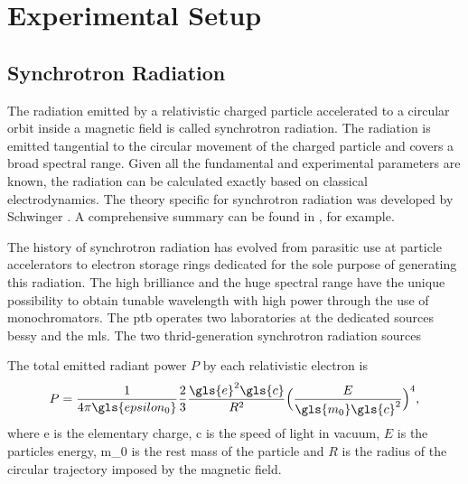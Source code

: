 \chapter{Experimental Setup}
\section{Synchrotron Radiation}
The radiation emitted by a relativistic charged particle accelerated to a circular orbit inside a magnetic field is called synchrotron radiation. The radiation is emitted tangential to the circular movement of the charged particle and covers a broad spectral range. Given all the fundamental and experimental parameters are known, the radiation can be calculated exactly based on classical electrodynamics. The theory specific for synchrotron radiation was developed by Schwinger \cite{schwinger_classical_1949}. A comprehensive summary can be found in \cite{munro_chapter_1987}, for example.

The history of synchrotron radiation has evolved from parasitic use at particle accelerators to electron storage rings dedicated for the sole purpose of generating this radiation. The high brilliance and the huge spectral range have the unique possibility to obtain tunable wavelength with high power through the use of monochromators. The \gls{ptb} operates two laboratories at the dedicated sources \gls{bessy} and the \gls{mls}. The two thrid-generation synchrotron radiation sources 

The total emitted radiant power $P$ by each relativistic electron is
\begin{align}
 P = \frac{1}{4 \pi \gls{epsilon_0}} \frac{2}{3} \frac{\gls{e}^2 \gls{c}}{R^2}\Big( \frac{E}{\gls{m_0} \gls{c}^2}\Big)^4 \text{,}
\end{align}
where \gls{e} is the elementary charge, \gls{c} is the speed of light in vacuum, $E$ is the particles energy, \gls{m_0} is the rest mass of the particle and $R$ is the radius of the circular trajectory imposed by the magnetic field.

